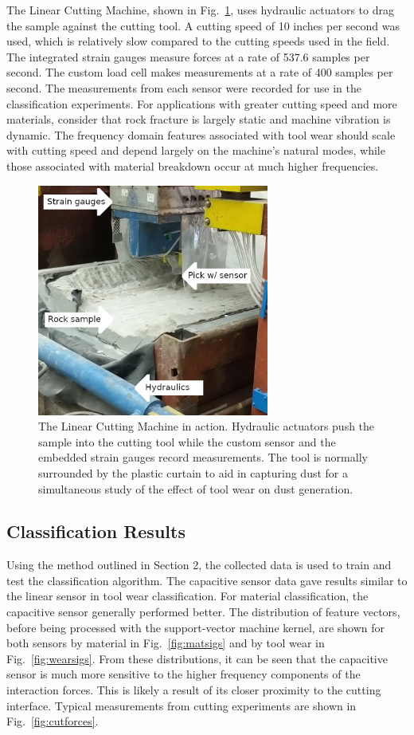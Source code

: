 The Linear Cutting Machine, shown in Fig.~\ref{fig:lcmaction},
 uses hydraulic actuators to drag the sample against the cutting tool.
A cutting speed of 10 inches per second was used, which is relatively slow 
 compared to the cutting speeds used in the field.
The integrated strain gauges measure forces at a rate of 537.6 samples per second. 
The custom load cell makes measurements at a rate of 400 samples per second.
The measurements from each sensor were recorded for use in the classification experiments.
For applications with greater cutting speed and more materials, 
 consider that rock fracture is largely static and machine vibration is dynamic.
The frequency domain features associated with tool wear should scale with cutting speed 
 and depend largely on the machine's natural modes, 
 while those associated with material breakdown occur at much higher frequencies.

\begin{figure}[t!]
\centering
\includegraphics[width=3in]{figures/p1_media/Fig6.jpg}
\caption{
The Linear Cutting Machine in action. Hydraulic actuators push the sample into the cutting tool
while the custom sensor and the embedded strain gauges record measurements. 
The tool is normally surrounded by the plastic curtain to aid in capturing dust for a 
 simultaneous study of the effect of tool wear on dust generation.
}
\label{fig:lcmaction}
\end{figure}

\subsection{Classification Results}

Using the method outlined in Section 2, the collected data is used to train and test
 the classification algorithm.
The capacitive sensor data gave results similar to the linear sensor in tool wear classification.
For material classification, the capacitive sensor generally performed better.
The distribution of feature vectors, before being processed with the support-vector machine kernel,
 are shown for both sensors by material in Fig.~\ref{fig:matsigs} and by tool wear in Fig.~\ref{fig:wearsigs}. 
From these distributions, it can be seen that the capacitive sensor is much more sensitive to the higher frequency 
 components of the interaction forces. 
This is likely a result of its closer proximity to the cutting interface.
Typical measurements from cutting experiments are shown in Fig.~\ref{fig:cutforces}. 

